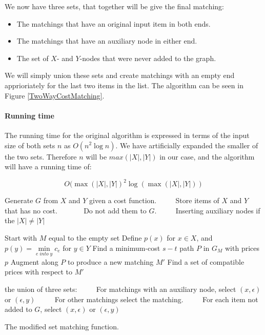 \documentclass[11pt]{article}
\begin{document}
\endgroup

We now have three sets, that together will be give the final matching:
\begin{itemize}
   \item The matchings that have an original input item in both ends.
   \item The matchings that have an auxiliary node in either end.
   \item The set of $X$- and $Y$-nodes that were never added to the graph.
\end{itemize}

We will simply union these sets and create matchings with an empty end apprioriately for the last two items in the list. The algorithm can be seen in Figure \ref{TwoWayCostMatching}.

\paragraph{Running time} The running time for the original algorithm is expressed in terms of the input size of both sets $n$ as $O(n^2 \log n)$. We have artificially expanded the smaller of the two sets. Therefore $n$ will be $max(|X|, |Y|)$ in our case, and the algorithm will have a running time of:

\begin{equation}
O(\max(|X|, |Y|)^2 \log (\max(|X|, |Y|)) \nonumber
\end{equation}


\begin{algorithm}
\begin{algorithmic}
	\State Generate $G$ from $X$ and $Y$ given a cost function.
	\State ~~~~ Store items of $X$ and $Y$ that has no cost.
	\State ~~~~~~ Do not add them to $G$.
	\State ~~~~ Inserting auxiliary nodes if the $|X| \neq |Y|$


	\State Start with $M$ equal to the empty set
	\State Define $p(x)$ for $x \in X$, and  $p(y) = \underset{e \; into \; y}{\operatorname{min}} c_e$ for $y \in Y$
    	\State Find a minimum-cost $s-t$ path $P$ in $G_M$ with prices $p$
    	\State Augment along $P$ to produce a new matching $M'$
    	\State Find a set of compatible prices with respect to $M'$
    \EndWhile
    

	\Return the union of three sets:
    \State ~~~~ For matchings with an auxiliary node, select $(x, \epsilon)$ or $(\epsilon, y)$
    \State ~~~~ For other matchings select the matching.
    \State ~~~~ For each item not added to $G$, select $(x, \epsilon)$ or $(\epsilon, y)$    
\EndFunction
\end{algorithmic}
\caption{The modified set matching function.}
\label{TwoWayCostMatching}
\end{algorithm}
\end{document}
